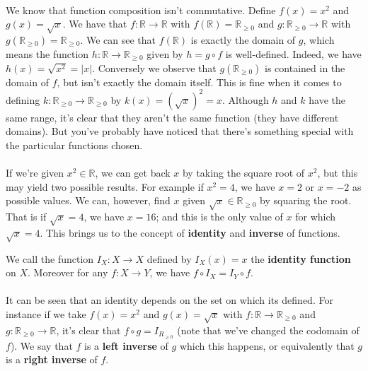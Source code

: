 \documentclass[12pt, a4paper, titlepage, twoside]{article}
\newcommand*{\R}{\mathbb{R}}
\begin{document}
	\paragraph{}
	We know that function composition isn't commutative.
	Define $f(x) = x^2$ and $g(x) = \sqrt{x}$. We have that $f : \R \to \R$ with $f(\R) = \R_{\geqslant 0} $ and $g : \R_{\geqslant 0} \to \R$
	with $g(\R_{\geqslant 0} ) = \R_{\geqslant 0}$. We can see that $f(\R)$ is exactly the domain of $g$, which means
	the function $h : \R \to \R_{\geqslant 0}$ given by $h = g \circ f$ is well-defined. Indeed, we have $h(x) = \sqrt{x^2} = |x|$.
	Conversely we observe that $g(\R_{\geqslant 0})$ is contained in the domain of $f$, but isn't exactly the domain itself.
	This is fine when it comes to defining $k : \R_{\geqslant 0} \to \R_{\geqslant 0}$ by $k(x) = (\sqrt{x})^2 = x$. Although $h$ and $k$ have
	the same range, it's clear that they aren't the same function (they have different domains). But you've probably have noticed that there's 
	something special with the particular functions chosen.
	
	\paragraph{}
	If we're given $x^2 \in \R$, we can get back $x$ by taking the square root of $x^2$, but this may yield two possible results. For example
	if $x^2 = 4$, we have $x = 2$ or $x = -2$ as possible values. We can, however, find $x$ given $\sqrt{x} \in \R_{\geqslant 0}$ by
	squaring the root. That is if $\sqrt{x} = 4$, we have $x = 16$; and this is the only value of $x$ for which $\sqrt{x} = 4$.
	This brings us to the concept of \textbf{identity} and \textbf{inverse} of functions.\\
	
	\begin{kp}
		We call the function $I_X : X \to X$ defined by $I_X(x) = x$ the \textbf{identity function} on $X$. Moreover for any $f : X \to Y$, we have 
		$f \circ I_X = I_Y \circ f$.
	\end{kp} 
	
	\paragraph{}
	It can be seen that an identity depends on the set on which its defined. For instance if we take $f(x) = x^2$ and $g(x) = \sqrt{x}$
	with $f : \R \to \R_{\geqslant 0}$ and $g : \R_{\geqslant 0} \to \R$, it's clear that $f \circ g = I_{R_{\geqslant 0}}$ (note that we've changed
	the codomain of $f$). We say that $f$ is a \textbf{left inverse} of $g$ which this happens, or equivalently that $g$ is a \textbf{right inverse} 
	of $f$.\\
	
\end{document}
